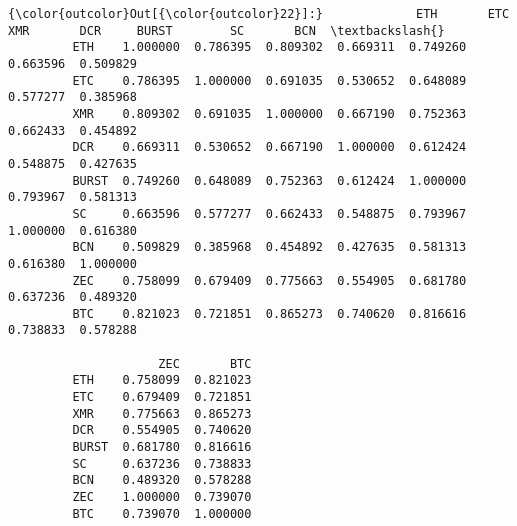\documentclass[11pt]{article}
\begin{document}
\begin{Verbatim}[commandchars=\\\{\}]
{\color{outcolor}Out[{\color{outcolor}22}]:}             ETH       ETC       XMR       DCR     BURST        SC       BCN  \textbackslash{}
         ETH    1.000000  0.786395  0.809302  0.669311  0.749260  0.663596  0.509829   
         ETC    0.786395  1.000000  0.691035  0.530652  0.648089  0.577277  0.385968   
         XMR    0.809302  0.691035  1.000000  0.667190  0.752363  0.662433  0.454892   
         DCR    0.669311  0.530652  0.667190  1.000000  0.612424  0.548875  0.427635   
         BURST  0.749260  0.648089  0.752363  0.612424  1.000000  0.793967  0.581313   
         SC     0.663596  0.577277  0.662433  0.548875  0.793967  1.000000  0.616380   
         BCN    0.509829  0.385968  0.454892  0.427635  0.581313  0.616380  1.000000   
         ZEC    0.758099  0.679409  0.775663  0.554905  0.681780  0.637236  0.489320   
         BTC    0.821023  0.721851  0.865273  0.740620  0.816616  0.738833  0.578288   
         
                     ZEC       BTC  
         ETH    0.758099  0.821023  
         ETC    0.679409  0.721851  
         XMR    0.775663  0.865273  
         DCR    0.554905  0.740620  
         BURST  0.681780  0.816616  
         SC     0.637236  0.738833  
         BCN    0.489320  0.578288  
         ZEC    1.000000  0.739070  
         BTC    0.739070  1.000000  
\end{Verbatim}
            
\end{document}
